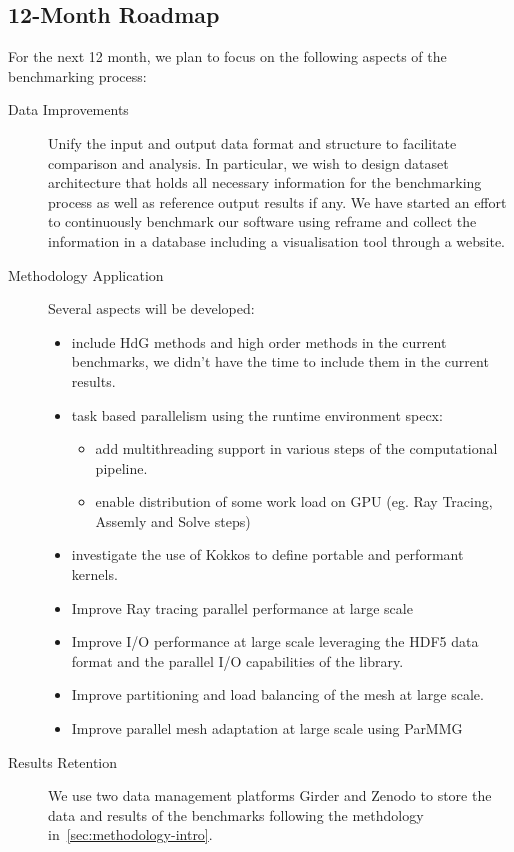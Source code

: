 \subsection{12-Month Roadmap}
\label{sec:WP1:Feelpp:roadmap}

For the next 12 month, we plan to focus on the following aspects of the benchmarking process:
\begin{description}
    \item[Data Improvements] Unify the input and output data format and structure to facilitate comparison and analysis. In particular, we wish to design dataset architecture that holds all necessary information for the benchmarking process as well as reference output results if any.  We have started an effort to continuously benchmark our software using reframe and collect the information in a database including a visualisation tool through a website.
    \item[Methodology Application] Several aspects will be developed:
    \begin{itemize}
        \item include HdG methods and high order methods in the current benchmarks, we didn't have the time to include them in the current results.
        \item task based parallelism using the runtime environment \ac{specx}:
        \begin{itemize}
            \item add multithreading support in various steps of the computational pipeline.
            \item enable distribution of some work load on GPU (eg. Ray Tracing, Assemly and Solve steps)
        \end{itemize}
        \item investigate the use of Kokkos to define portable and performant kernels.
        \item Improve Ray tracing parallel performance at large scale
        \item Improve I/O performance at large scale leveraging the HDF5 data format and the parallel I/O capabilities of the library.
        \item Improve partitioning and load balancing of the mesh at large scale.
        \item Improve parallel mesh adaptation at large scale using ParMMG
    \end{itemize}
    \item[Results Retention] We use two data management platforms Girder and Zenodo to store the data and results of the benchmarks following the methdology in~\cref{sec:methodology-intro}.
\end{description}

